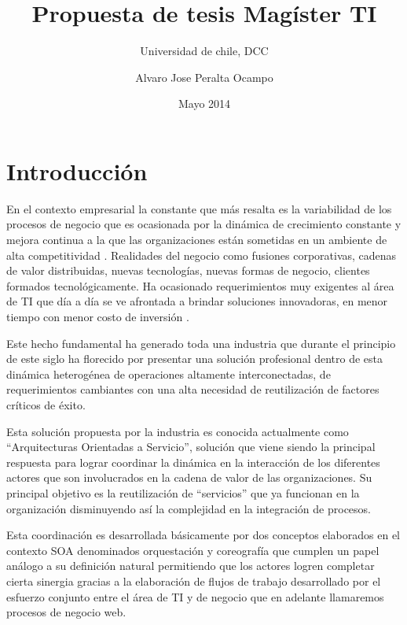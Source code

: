 \documentclass[spanish]{article}
\begin{document}
\title{Propuesta de tesis Magíster TI}


\author{Universidad de chile, DCC}


\author{Alvaro Jose Peralta Ocampo}


\date{Mayo 2014}

\maketitle

\section{Introducción}

En el contexto empresarial la constante que más resalta es la variabilidad
de los procesos de negocio que es ocasionada por la dinámica de crecimiento
constante y mejora continua a la que las organizaciones están sometidas
en un ambiente de alta competitividad . Realidades del negocio como
fusiones corporativas, cadenas de valor distribuidas, nuevas tecnologías,
nuevas formas de negocio, clientes formados tecnológicamente. Ha ocasionado
requerimientos muy exigentes al área de TI que día a día se ve afrontada
a brindar soluciones innovadoras, en menor tiempo con menor costo
de inversión \cite{libroInteroperabilidadDCC2009}.

Este hecho fundamental ha generado toda una industria que durante
el principio de este siglo ha florecido por presentar una solución
profesional dentro de esta dinámica heterogénea de operaciones altamente
interconectadas, de requerimientos cambiantes con una alta necesidad
de reutilización de factores críticos de éxito.

Esta solución propuesta por la industria es conocida actualmente como
``Arquitecturas Orientadas a Servicio”, solución que viene siendo
la principal respuesta para lograr coordinar la dinámica en la interacción
de los diferentes actores que son involucrados en la cadena de valor
de las organizaciones. Su principal objetivo es la reutilización de
``servicios” que ya funcionan en la organización disminuyendo así
la complejidad en la integración de procesos.

Esta coordinación es desarrollada básicamente por dos conceptos elaborados
en el contexto SOA denominados orquestación y coreografía que cumplen
un papel análogo a su definición natural permitiendo que los actores
logren completar cierta sinergia gracias a la elaboración de flujos
de trabajo desarrollado por el esfuerzo conjunto entre el área de
TI y de negocio que en adelante llamaremos procesos de negocio web.
\end{document}
